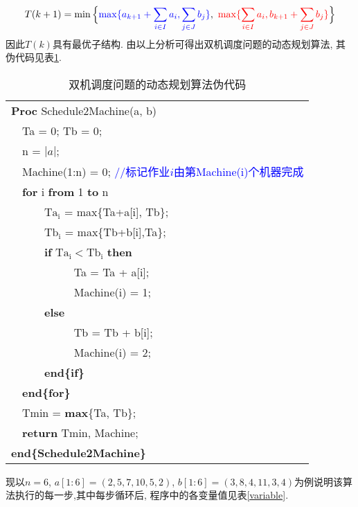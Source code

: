 \begin{solution}
\[
T(k+1) = \min
\Big\{
         \textcolor{blue}{\max\{
              a_{k+1}+\sum\limits_{i\in I}a_i, \sum\limits_{j\in J}b_j
             \}}, {~}
          \textcolor{red}{\max\{
               \sum\limits_{i\in I}a_i, b_{k+1}+\sum\limits_{j\in J}b_j
               \}}
\Big\}
\]
因此$T(k)$具有最优子结构. 由以上分析可得出双机调度问题的动态规划算法, 其伪代码见表\ref{Schedule2Machine}.
\newpage
\begin{table}[!htb]
\centering
\caption{\label{Schedule2Machine}双机调度问题的动态规划算法伪代码}
\begin{tabular}{llll}
\hline
\multicolumn{4}{l}{\textbf{Proc} Schedule2Machine(a, b)} \\
 & \multicolumn{3}{l}{Ta = 0; Tb = 0;} \\
 & \multicolumn{3}{l}{n = $|a|$;} \\
 & \multicolumn{3}{l}{Machine(1:n) = 0; \textcolor{blue}{//标记作业$i$由第Machine(i)个机器完成}} \\
 & \multicolumn{3}{l}{\textbf{for} i \textbf{from} 1 \textbf{to} n} \\
 &  & \multicolumn{2}{l}{$\mathrm{Ta_i}$ = max\{Ta+a[i], Tb\};} \\
 &  & \multicolumn{2}{l}{$\mathrm{Tb_i}$ = max\{Tb+b[i],Ta\};} \\
 &  & \multicolumn{2}{l}{\textbf{if} $\mathrm{Ta_i < Tb_i}$ \textbf{then}} \\
 &  &  & Ta = Ta + a[i]; \\
 &  &  & Machine(i) = 1; \\
 &  & \multicolumn{2}{l}{\textbf{else}} \\
 &  &  & Tb = Tb + b[i]; \\
 &  &  & Machine(i) = 2; \\
 &  & \multicolumn{2}{l}{\textbf{end\{if\}}} \\
 & \multicolumn{3}{l}{\textbf{end\{for\}}} \\
 & \multicolumn{3}{l}{Tmin = \textbf{max}\{Ta, Tb\};} \\
 & \multicolumn{3}{l}{\textbf{return} Tmin, Machine;} \\
\multicolumn{4}{l}{\textbf{end\{Schedule2Machine\}}} \\
\hline
\end{tabular}
\end{table}
现以$n = 6$, $a[1:6] = (2, 5, 7, 10, 5, 2)$, $b[1:6] = (3, 8, 4, 11, 3, 4)$为例说明该算法执行的每一步,其中每步循环后, 程序中的各变量值见表\ref{variable}.
\begin{table}[!htb]
\centering

\end{table}
\end{solution}

